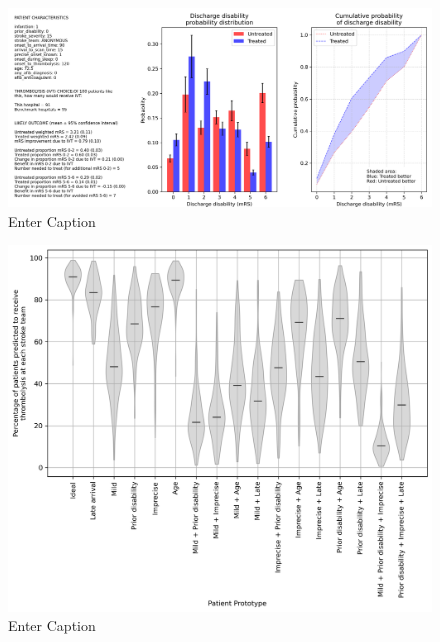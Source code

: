 \begin{figure}
    \centering
    \includegraphics[width=1.0\linewidth]{images/prototype_patient_ideal}
    \caption{Enter Caption}
    \label{fig:example_patient_outcome}
\end{figure}


\begin{figure}
    \centering
    \includegraphics[width=0.75\linewidth]{images/prototype_patients_all_teams}
    \caption{Enter Caption}
    \label{fig:thrombolysis_rates_prototype_patients}
\end{figure}


